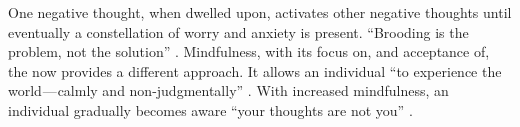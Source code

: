 One negative thought, when dwelled upon, activates other negative thoughts until eventually a constellation of worry and anxiety is present. “Brooding is the problem, not the solution” \citep[][p30]{williams_mindfulness:_2011}. Mindfulness, with its focus on, and acceptance of, the now provides a different approach. It allows an individual “to experience the world — calmly and non-judgmentally” \citep[][p45]{williams_mindfulness:_2011}. With increased mindfulness, an individual gradually becomes aware “your thoughts are not you” \citep[][p64]{williams_mindfulness:_2011}.